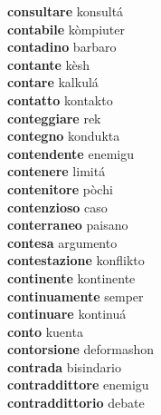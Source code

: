 \textbf{consultare } konsultá \\
\textbf{contabile } kòmpiuter \\
\textbf{contadino } barbaro \\
\textbf{contante } kèsh \\
\textbf{contare } kalkulá \\
\textbf{contatto } kontakto \\
\textbf{conteggiare } rek \\
\textbf{contegno } kondukta \\
\textbf{contendente } enemigu \\
\textbf{contenere } limitá \\
\textbf{contenitore } pòchi \\
\textbf{contenzioso } caso \\
\textbf{conterraneo } paisano \\
\textbf{contesa } argumento \\
\textbf{contestazione } konflikto \\
\textbf{continente } kontinente \\
\textbf{continuamente } semper \\
\textbf{continuare } kontinuá \\
\textbf{conto } kuenta \\
\textbf{contorsione } deformashon \\
\textbf{contrada } bisindario \\
\textbf{contraddittore } enemigu \\
\textbf{contraddittorio } debate \\
